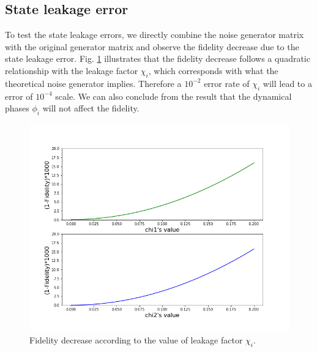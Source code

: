 \documentclass[conference, 9pt]{IEEEtran}
\begin{document}
\subsection{State leakage error}
To test the state leakage errors, we directly combine the noise generator matrix with the original generator matrix and observe the fidelity decrease due to the state leakage error. Fig. \ref{fig:stateleak} illustrates that the fidelity decrease follows a quadratic relationship with the leakage factor $\chi_i$, which corresponds with what the theoretical noise generator implies. Therefore a $10^{-2}$ error rate of $\chi_i$ will lead to a error of  $10^{-4}$ scale. We can also conclude from the result that the dynamical phases $\phi_i$ will not affect the fidelity. 
\begin{figure}
    \centering
    \includegraphics[width = .90\linewidth]{Figures/result1.png}
    \caption{Fidelity decrease according to the value of leakage factor $\chi_i$. }
    \label{fig:stateleak}
\end{figure}
\fi
\end{document}
